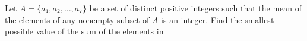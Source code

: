 Let $A=\{a_1,a_2,\ldots,a_7\}$ be a set of distinct positive integers such that the mean of the elements of any nonempty subset of $A$ is an integer. Find the smallest possible value of the sum of the elements in 